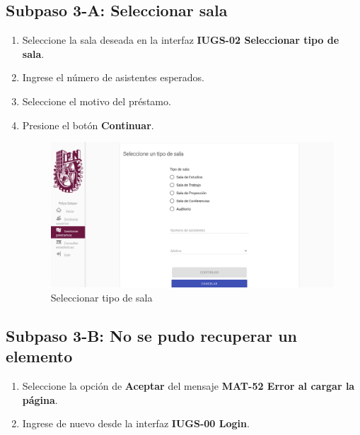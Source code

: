 \subsection{Subpaso 3-A: Seleccionar sala}
\begin{enumerate}
	\item Seleccione la sala deseada en la interfaz
    \textbf{IUGS-02 Seleccionar tipo de sala}.
\item Ingrese el número de asistentes esperados.
\item Seleccione el motivo del préstamo.
\item Presione el botón \textbf{Continuar}.
\begin{figure}[hbtp]
	\includegraphics[scale=0.3]{images/Interfaz/IUGS-02 Seleccionar tipo de sala.png}
	\caption{Seleccionar tipo de sala}
	\end{figure}
\end{enumerate}

\subsection{Subpaso 3-B: No se pudo recuperar un elemento}
\begin{enumerate}
	\item Seleccione la opción de \textbf{Aceptar} del mensaje
\textbf{MAT-52 Error al cargar la página}.
	\item Ingrese de nuevo desde la interfaz 
\textbf{IUGS-00 Login}.
\end{enumerate}

